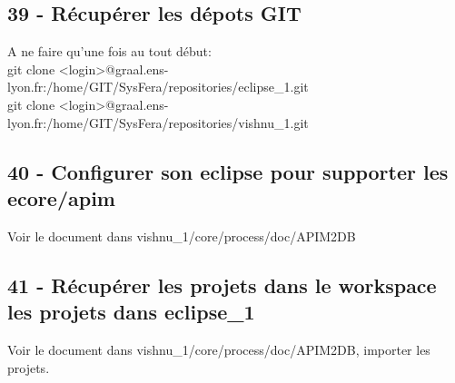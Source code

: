 \documentclass{article}
\begin{document}
\subsection{39 - Récupérer les dépots GIT}
A ne faire qu'une fois au tout début: \\
git clone <login>@graal.ens-lyon.fr:/home/GIT/SysFera/repositories/eclipse\_1.git \\
git clone <login>@graal.ens-lyon.fr:/home/GIT/SysFera/repositories/vishnu\_1.git

\subsection{40 - Configurer son eclipse pour supporter les ecore/apim}
Voir le document dans vishnu\_1/core/process/doc/APIM2DB

\subsection{41 - Récupérer les projets dans le workspace les projets dans eclipse\_1}
Voir le document dans vishnu\_1/core/process/doc/APIM2DB, importer les projets.%
\end{document}
